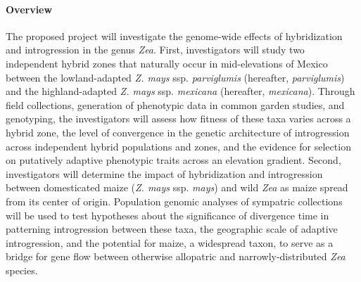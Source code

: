 
%
%
%
%
%
%

\paragraph{Overview} The proposed project will investigate the genome-wide effects of hybridization and introgression in the genus \emph{Zea}.  First, investigators will study two independent hybrid zones that naturally occur in mid-elevations of Mexico between the lowland-adapted \emph{Z. mays} ssp. \emph{parviglumis} (hereafter, \emph{parviglumis}) and the highland-adapted \emph{Z. mays} ssp. \emph{mexicana} (hereafter, \emph{mexicana}).  Through field collections, generation of phenotypic data in common garden studies, and genotyping, the investigators will assess how fitness of these taxa varies across a hybrid zone, the level of convergence in the genetic architecture of introgression across independent hybrid populations and zones, and the evidence for selection on putatively adaptive phenotypic traits across an elevation gradient. Second, investigators will determine the impact of hybridization and introgression between domesticated maize (\emph{Z. mays} ssp. \emph{mays}) and wild  \emph{Zea} as maize spread from its center of origin. Population genomic analyses of sympatric collections will be used to test hypotheses about the significance of divergence time in patterning introgression between these taxa, the geographic scale of adaptive introgression, and the potential for maize, a widespread taxon, to serve as a bridge for gene flow between otherwise allopatric and narrowly-distributed \emph{Zea} species.

